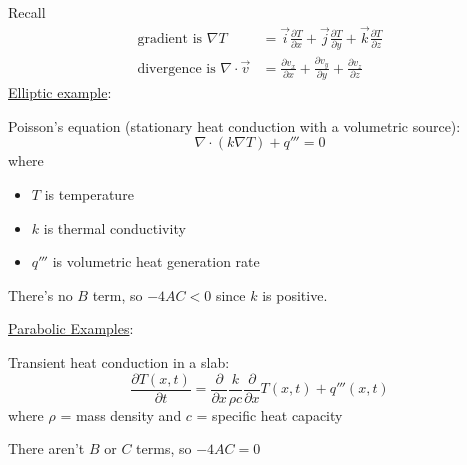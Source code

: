 \documentclass[12pt]{article}
\begin{document}
Recall
%
\begin{align}
\text{gradient is } \nabla T &= \vec{i}\frac{\partial T}{\partial x} + \vec{j}\frac{\partial T}{\partial y} + \vec{k}\frac{\partial T}{\partial z} \nonumber \\
%
\text{divergence is } \nabla \cdot \vec{v} &= \frac{\partial v_x}{\partial x} + \frac{\partial v_y}{\partial y} + \frac{\partial v_z}{\partial z} \nonumber
\end{align}
\vspace*{1em}
\noindent \underline{Elliptic example}:

\noindent Poisson's equation (stationary heat conduction with a volumetric source):
%
\begin{equation}
\nabla \cdot (k \nabla T) + q''' = 0 \nonumber
\end{equation}
% 
where
\begin{itemize}
\item $T$ is temperature
\item $k$ is thermal conductivity
\item $q'''$ is volumetric heat generation rate
\end{itemize}
%
There's no $B$ term, so $-4AC < 0$ since $k$ is positive.


\vspace*{1em}
\noindent \underline{Parabolic Examples}:

Transient heat conduction in a slab:
%
\begin{equation}
\frac{\partial T(x,t)}{\partial t} = \frac{\partial}{\partial x} \frac{k}{\rho c} \frac{\partial}{\partial x} T(x,t) + q'''(x,t) \nonumber
\end{equation}
%
where $\rho$ = mass density and $c$ = specific heat capacity

\noindent There aren't $B$ or $C$ terms, so $-4AC = 0$
\end{document}

